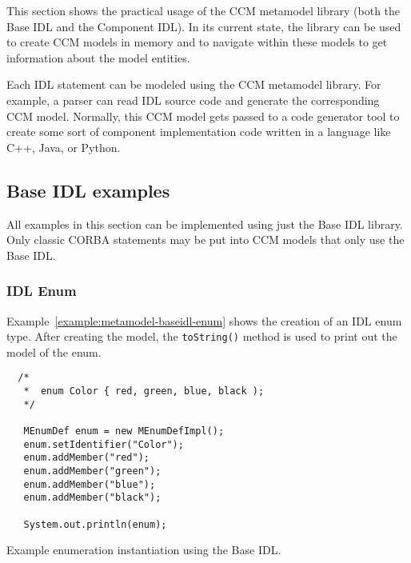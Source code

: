 This section shows the practical usage of the CCM metamodel library (both the
Base IDL and the Component IDL). In its current state, the library can be used
to create CCM models in memory and to navigate within these models to get
information about the model entities.

Each IDL statement can be modeled using the CCM metamodel library. For example,
a parser can read IDL source code and generate the corresponding CCM model.
Normally, this CCM model gets passed to a code generator tool to create some
sort of component implementation code written in a language like C++, Java, or
Python.

\subsection{Base IDL examples}

All examples in this section can be implemented using just the Base IDL library.
Only classic CORBA statements may be put into CCM models that only use the Base
IDL.

\subsubsection{IDL Enum}

Example~\ref{example:metamodel-baseidl-enum} shows the creation of an IDL enum
type. After creating the model, the {\tt toString()} method is used to print out
the model of the enum.

\begin{Example}
\begin{minifbox}
\begin{small}
\begin{verbatim}
  /*
   *  enum Color { red, green, blue, black );
   */

   MEnumDef enum = new MEnumDefImpl();
   enum.setIdentifier("Color");
   enum.addMember("red");
   enum.addMember("green");
   enum.addMember("blue");
   enum.addMember("black");

   System.out.println(enum);
\end{verbatim}
\end{small}
\end{minifbox}
\caption{Example enumeration instantiation using the Base IDL.}
\label{example:metamodel-baseidl-enum}
\end{Example}

